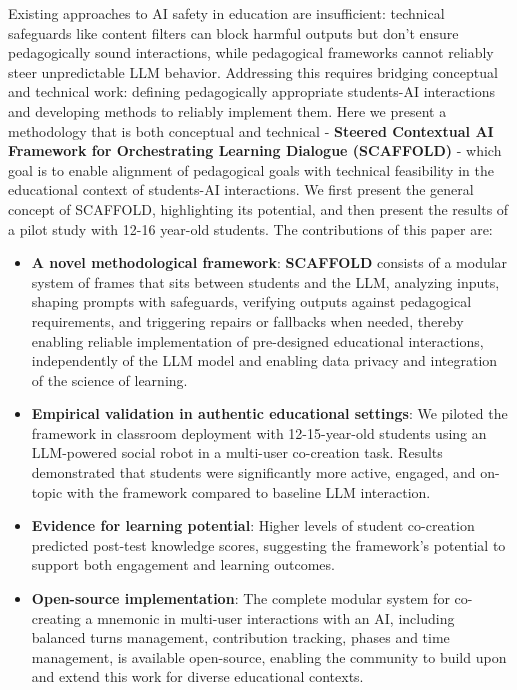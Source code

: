 \documentclass[fleqn,10pt]{wlscirep}
\begin{document}
Existing approaches to AI safety in education are insufficient: technical safeguards like content filters can block harmful outputs but don't ensure pedagogically sound interactions, while pedagogical frameworks cannot reliably steer unpredictable LLM behavior. Addressing this requires bridging conceptual and technical work: defining pedagogically appropriate students-AI interactions and developing methods to reliably implement them. Here we present a methodology that is both conceptual and technical - \textbf{Steered Contextual AI Framework for Orchestrating Learning Dialogue (SCAFFOLD)} - which goal is to enable alignment of pedagogical goals with technical feasibility in the educational context of students-AI interactions. We first present the general concept of SCAFFOLD, highlighting its potential, and then present the results of a pilot study with 12-16 year-old students. The contributions of this paper are:

\begin{itemize}
\item \textbf{A novel methodological framework}: \textbf{SCAFFOLD} consists of a modular system of frames that sits between students and the LLM, analyzing inputs, shaping prompts with safeguards, verifying outputs against pedagogical requirements, and triggering repairs or fallbacks when needed, thereby enabling reliable implementation of pre-designed educational interactions, independently of the LLM model and enabling data privacy and integration of the science of learning.
\item \textbf{Empirical validation in authentic educational settings}: We piloted the framework in classroom deployment with 12-15-year-old students using an LLM-powered social robot in a multi-user co-creation task. Results demonstrated that students were significantly more active, engaged, and on-topic with the framework compared to baseline LLM interaction.
\item \textbf{Evidence for learning potential}: Higher levels of student co-creation predicted post-test knowledge scores, suggesting the framework's potential to support both engagement and learning outcomes.
\item \textbf{Open-source implementation}: The complete modular system for co-creating a mnemonic in multi-user interactions with an AI, including balanced turns management, contribution tracking, phases and time management, is available open-source, enabling the community to build upon and extend this work for diverse educational contexts.
\end{itemize}
\end{document}

